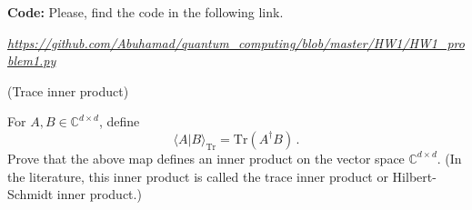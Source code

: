 \documentclass[12pt]{article}
\renewcommand{\>}{\rangle}
\newcommand{\<}{\langle}
\newcommand{\C}{\mathbb{C}}
\begin{document}
\noindent
\textbf{Code:} Please, find the code in the following link.

\noindent
{\small \em \url{ https://github.com/Abuhamad/quantum_computing/blob/master/HW1/HW1_problem1.py}}


\newpage


 (Trace inner product)

\medskip
\noindent
For $A,B\in\C^{d\times d}$, define
\[
\< A | B\>_{\mathrm{Tr}} = \mathrm{Tr}(A^\dagger B)\,.
\]
Prove that the above map defines an inner product on the vector space $\C^{d\times d}$. (In the literature, this inner product is called the trace inner product or Hilbert-Schmidt inner product.) \newline
\end{document}

